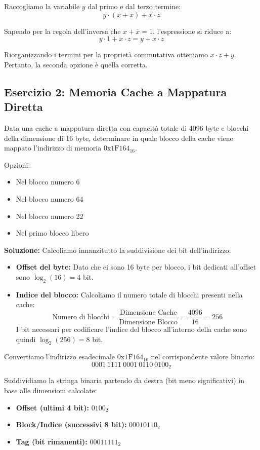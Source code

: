 \documentclass[12pt, a4paper]{article}
\begin{document}
Raccogliamo la variabile $y$ dal primo e dal terzo termine:
$$y \cdot (x + \overline{x}) + x \cdot z$$

Sapendo per la regola dell'inversa che $x + \overline{x} = 1$, l'espressione si riduce a:
$$y \cdot 1 + x \cdot z = y + x \cdot z$$

Riorganizzando i termini per la proprietà commutativa otteniamo \textbf{$x \cdot z + y$}. Pertanto, la seconda opzione è quella corretta.

\subsection{Esercizio 2: Memoria Cache a Mappatura Diretta}
Data una cache a mappatura diretta con capacità totale di 4096 byte e blocchi della dimensione di 16 byte, determinare in quale blocco della cache viene mappato l'indirizzo di memoria $0\text{x}1\text{F}164_{16}$.

Opzioni:
\begin{itemize}
    \item Nel blocco numero 6
    \item Nel blocco numero 64
    \item Nel blocco numero 22
    \item Nel primo blocco libero
\end{itemize}

\newpage

\textbf{Soluzione:}
Calcoliamo innanzitutto la suddivisione dei bit dell'indirizzo:
\begin{itemize}
    \item \textbf{Offset del byte:} Dato che ci sono 16 byte per blocco, i bit dedicati all'offset sono $\log_2(16) = 4$ bit.
    \item \textbf{Indice del blocco:} Calcoliamo il numero totale di blocchi presenti nella cache:
    $$\text{Numero di blocchi} = \frac{\text{Dimensione Cache}}{\text{Dimensione Blocco}} = \frac{4096}{16} = 256$$
    I bit necessari per codificare l'indice del blocco all'interno della cache sono quindi $\log_2(256) = 8$ bit.
\end{itemize}

Convertiamo l'indirizzo esadecimale $0\text{x}1\text{F}164_{16}$ nel corrispondente valore binario:
$$0001\ 1111\ 0001\ 0110\ 0100_2$$

Suddividiamo la stringa binaria partendo da destra (bit meno significativi) in base alle dimensioni calcolate:
\begin{itemize}
    \item \textbf{Offset (ultimi 4 bit):} $0100_2$
    \item \textbf{Block/Indice (successivi 8 bit):} $00010110_2$
    \item \textbf{Tag (bit rimanenti):} $00011111_2$
\end{itemize}
\end{document}
